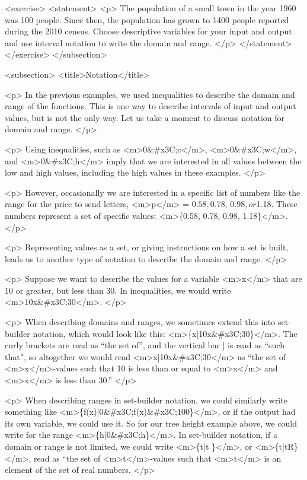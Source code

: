         <exercise>
            <statement>
                <p>
                    The population of a small town in the year 1960 was 100 people.
                    Since then, the population has grown to 1400 people reported during the 2010 census.
                    Choose descriptive variables for your input and output and use interval notation to write the domain and range.
                </p>
            </statement>
        </exercise>
    </subsection>


    <subsection>
        <title>Notation</title>

        <p>
            In the previous examples, we used inequalities to describe the domain and range of the functions.
            This is one way to describe intervals of input and output values, but is not the only way.
            Let us take a moment to discuss notation for domain and range.
        </p>

        <p>
            Using inequalities, such as <m>0&#x3C;c</m>, <m>0&#x3C;w</m>, and <m>0&#x3C;h</m> imply that we are interested in all values between the low and high values, including the high values in these examples.
        </p>

        <p>
            However, occasionally we are interested in a specific list of numbers like the range for the price to send letters, <m>p</m> = $0.58, $0.78, $0.98, or $1.18.
            These numbers represent a set of specific values: <m>\{0.58, 0.78, 0.98, 1.18\}</m>.
        </p>

        <p>
            Representing values as a set, or giving instructions on how a set is built, leads us to another type of notation to describe the domain and range.
        </p>

        <p>
            Suppose we want to describe the values for a variable <m>x</m> that are 10 or greater, but less than 30.
            In inequalities, we would write <m>10\leq x&#x3C;30</m>.
        </p>

        <p>
            When describing domains and ranges, we sometimes extend this into set-builder notation, which would look like this: <m>\{x|10\leq x&#x3C;30\}</m>.
            The curly brackets {}are read as “the set of”, and the vertical bar | is read as “such that”, so altogether we would read <m>{x|10\leq x&#x3C;30}</m> as “the set of <m>x</m>-values such that 10 is less than or equal to <m>x</m> and <m>x</m> is less than 30.”
        </p>

        <p>
            When describing ranges in set-builder notation, we could similarly write something like <m>\{f(x)|0&#x3C;f(x)&#x3C;100\}</m>, or if the output had its own variable, we could use it.
            So for our tree height example above, we could write for the range <m>\{h|0&#x3C;h\}</m>.
            In set-builder notation, if a domain or range is not limited, we could write <m>\{t|t \}</m>, or <m>\{t|t\in R\}</m>, read as “the set of <m>t</m>-values such that <m>t</m> is an element of the set of real numbers.
        </p>

